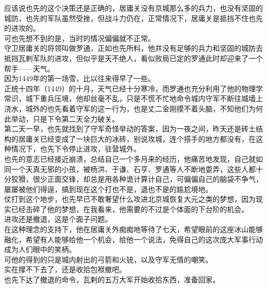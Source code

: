 \begin{multicols}{\theparacolNo}
应该说也先的这个决策还是正确的，居庸关没有京城那么多的兵力，也没有坚固的城防，也先的军队虽然受挫，但战斗力仍在，正常情况下，居庸关是抵挡不住也先的进攻的。\\

可也先想不到的是，当时的情况偏偏就不正常。\\

守卫居庸关的将领叫做罗通，正如也先所料，他并没有足够的兵力和坚固的城防去抵挡瓦剌军队的进攻，但似乎是天不绝人，看似败局已定的罗通此时却迎来了一个帮手——天气。\\

因为1449年的第一场雪，比以往来得早了一些。\\

正统十四年（1449）的十月，天气已经十分寒冷，而罗通也充分利用了他的物理学常识，城下重兵压境，他却丝毫不乱，只是不慌不忙地命令城内守军不断往城墙上浇水，城外的也先看着守军的这一行为，也是丈二金刚摸不着头脑，不知他们为何此举动，只是下令第二天全力破关。\\

第二天一早，也先就找到了守军奇怪举动的答案，因为一夜之间，昨天还是砖土结构的居庸关已经变成了一块巨大的冰砖，别说攻城，连个搭手的地方都没有，在这种情况下，也先下令停止进攻，驻营城外。\\

也先的意志已经接近崩溃，总结自己一个多月来的经历，他痛苦地发现，自己就如同一个天真无邪的小孩，被杨洪、于谦、石亨、罗通等人不断地耍弄，这些人都十分狡猾，很少正面交锋，却总是用各种诡计算计自己，可偏偏自己的脑袋不争气，屡屡被他们得逞，搞到现在这个打也不是，退也不是的尴尬境地。\\

仗打到这个地步，也先早已不敢奢望什么攻进北京城恢复大元之类的梦想，因为现实已经击碎了他的梦想，在我看来，他需要的不过是个体面的下台阶的机会。\\

进攻还是撤退，这是个面子问题。\\

在这种理念的支持下，他在居庸关外痴痴地等待了七天，希望眼前的这座冰山能够融化，希望有人能够给他一个机会，给他一个说法，免得自己的这次庞大军事行动成为人们眼中的笑柄。\\

可他的得到的只是城内射出的弓箭和火铳，以及守军无情的嘲笑。\\

实在撑不下去了，还是收拾包袱撤吧。\\

也先下达了撤退的命令，瓦剌的五万大军开始收拾东西，准备回家。\\


\end{multicols}
